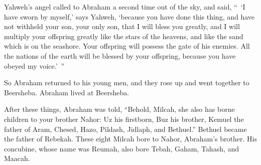 {\par }{\PP {}Yahweh’s angel called to Abraham a second time out of the sky,
and said, “ ‘I have sworn by myself,’ says Yahweh, ‘because you have done this thing, and have not withheld your son, your only son,
that I will bless you greatly, and I will multiply your offspring greatly like the stars of the heavens, and like the sand which is on the seashore. Your offspring will possess the gate of his enemies.
All the nations of the earth will be blessed by your offspring, because you have obeyed my voice.’ ”
\par }{\PP {}So Abraham returned to his young men, and they rose up and went together to Beersheba. Abraham lived at Beersheba.
\par }{\PP {}After these things, Abraham was told, “Behold, Milcah, she also has borne children to your brother Nahor:
Uz his firstborn, Buz his brother, Kemuel the father of Aram,
Chesed, Hazo, Pildash, Jidlaph, and Bethuel.”
Bethuel became the father of Rebekah. These eight Milcah bore to Nahor, Abraham’s brother.
His concubine, whose name was Reumah, also bore Tebah, Gaham, Tahash, and Maacah.

}

